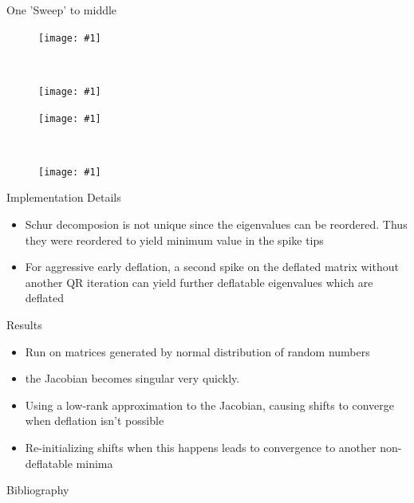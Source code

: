 \documentclass[12pt]{beamer}
\newcommand{\pic}[1]{\texttt{[image: \#1]}}
\begin{document}
  \begin{frame}{One 'Sweep' to middle}
    \vspace*{-.8cm}
    \begin{figure}[h!]
      \centering
      \begin{minipage}[t]{.5\linewidth}
        \centering
        \pic{midDef1}
      \end{minipage}~
      \begin{minipage}[t]{.5\linewidth}
        \centering
        \pic{midDef2}
      \end{minipage}

      \begin{minipage}[b]{.5\linewidth}
        \centering
        \pic{midDef3}
      \end{minipage}~
      \begin{minipage}[b]{.5\linewidth}
        \centering
        \pic{midDef4}
      \end{minipage}%
    \end{figure}
  \end{frame}

  \begin{frame}{Implementation Details}
    \begin{itemize}
      \item Schur decomposion is not unique since the eigenvalues can be reordered.
        Thus they were reordered to yield minimum value in the spike tips \cite{}
      \item For aggressive early deflation, a second spike on the deflated matrix
        without another QR iteration can yield further deflatable eigenvalues which are deflated\cite{}
    \end{itemize}
  \end{frame}

	\begin{frame}{Results}
    \begin{itemize}
      \item Run on matrices generated by normal distribution of random numbers
      \item the Jacobian becomes singular very quickly.
      \item Using a low-rank approximation to the Jacobian, causing shifts to converge when deflation isn't possible
      \item Re-initializing shifts when this happens leads to convergence to another non-deflatable minima
    \end{itemize}
	\end{frame}
	
	\nocite{*}
	\begin{frame}{Bibliography}
		
		
	\end{frame}
	
\end{document}
